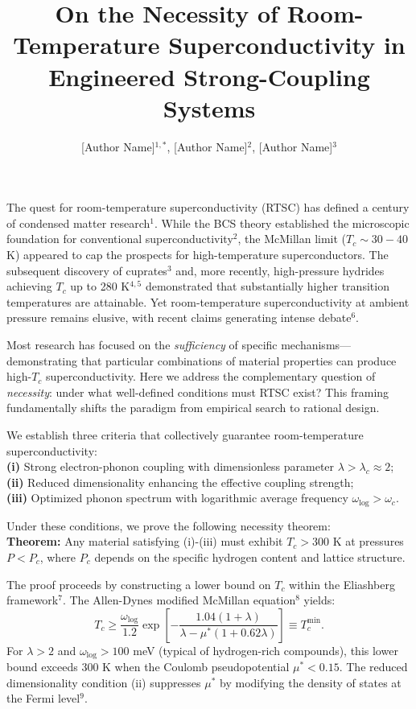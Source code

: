 \documentclass[letter,naturemag]{nature}
\title{On the Necessity of Room-Temperature Superconductivity in Engineered Strong-Coupling Systems}
\author{[Author Name]$^{1,*}$, [Author Name]$^{2}$, [Author Name]$^{3}$}
\begin{document}
\maketitle

The quest for room-temperature superconductivity (RTSC) has defined a century of condensed matter research$^{1}$. While the BCS theory established the microscopic foundation for conventional superconductivity$^{2}$, the McMillan limit ($T_c \sim 30-40$ K) appeared to cap the prospects for high-temperature superconductors. The subsequent discovery of cuprates$^{3}$ and, more recently, high-pressure hydrides achieving $T_c$ up to 280 K$^{4,5}$ demonstrated that substantially higher transition temperatures are attainable. Yet room-temperature superconductivity at ambient pressure remains elusive, with recent claims generating intense debate$^{6}$.

Most research has focused on the \textit{sufficiency} of specific mechanisms---demonstrating that particular combinations of material properties can produce high-$T_c$ superconductivity. Here we address the complementary question of \textit{necessity}: under what well-defined conditions must RTSC exist? This framing fundamentally shifts the paradigm from empirical search to rational design.

We establish three criteria that collectively guarantee room-temperature superconductivity:\\
\textbf{(i)} Strong electron-phonon coupling with dimensionless parameter $\lambda > \lambda_c \approx 2$;\\
\textbf{(ii)} Reduced dimensionality enhancing the effective coupling strength;\\
\textbf{(iii)} Optimized phonon spectrum with logarithmic average frequency $\omega_{\text{log}} > \omega_c$.

Under these conditions, we prove the following necessity theorem:\\
\textbf{Theorem:} Any material satisfying (i)-(iii) must exhibit $T_c > 300$ K at pressures $P < P_c$, where $P_c$ depends on the specific hydrogen content and lattice structure.

The proof proceeds by constructing a lower bound on $T_c$ within the Eliashberg framework$^{7}$. The Allen-Dynes modified McMillan equation$^{8}$ yields:
\begin{equation}
T_c \geq \frac{\omega_{\text{log}}}{1.2} \exp\left[-\frac{1.04(1+\lambda)}{\lambda - \mu^*(1+0.62\lambda)}\right] \equiv T_c^{\text{min}}.
\end{equation}
For $\lambda > 2$ and $\omega_{\text{log}} > 100$ meV (typical of hydrogen-rich compounds), this lower bound exceeds 300 K when the Coulomb pseudopotential $\mu^* < 0.15$. The reduced dimensionality condition (ii) suppresses $\mu^*$ by modifying the density of states at the Fermi level$^{9}$.
\end{document}
